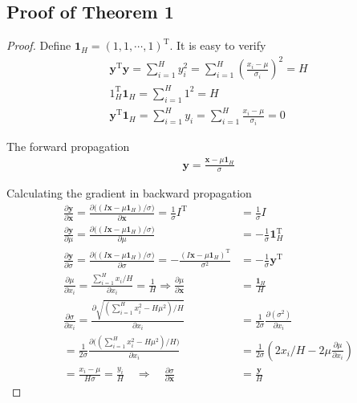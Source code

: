 \documentclass{article}
\newcommand*{\vect}[1]{\textbf{#1}}
\begin{document}
\subsection{Proof of Theorem 1}
\begin{proof}
Define $\vect{1}_H=(1, 1, \cdots, 1)^\text{T}$. It is easy to verify
\begin{equation}\begin{aligned}
\vect{y}^\text{T}\vect{y}=\sum\limits_{i=1}^Hy_i^2=\sum\limits_{i=1}^H(\frac{x_i-\mu}{\sigma_i})^2=H \\
\text{1}_H^\text{T}\vect{1}_H=\sum\limits_{i=1}^H1^2=H\\
\vect{y}^\text{T}\vect{1}_H=\sum\limits_{i=1}^Hy_i=\sum\limits_{i=1}^H\frac{x_i-\mu}{\sigma_i}=0
\end{aligned}\end{equation}

The forward propagation 
\begin{equation}\begin{aligned}
\vect{y}=\frac{\vect{x}-\mu\vect{1}_H}{\sigma}
\end{aligned}\end{equation}

Calculating the gradient in backward propagation
\begin{equation}\begin{aligned}
\frac{\partial\vect{y}}{\partial\vect{x}}=\frac{\partial\big((I\vect{x}-\mu\vect{1}_H)/\sigma\big)}{\partial \vect{x}}=\frac{1}{\sigma}I^\text{T}&=\frac{1}{\sigma}I \\
\frac{\partial\vect{y}}{\partial\mu} =\frac{\partial\big((I\vect{x}-\mu\vect{1}_H)/\sigma\big)}{\partial \mu}&=-\frac{1}{\sigma}\vect{1}_H^\text{T}\\
\frac{\partial\vect{y}}{\partial\sigma} =\frac{\partial\big((I\vect{x}-\mu\vect{1}_H)/\sigma\big)}{\partial \sigma}=-\frac{(I\vect{x}-\mu\vect{1}_H)^\text{T}}{\sigma^2}&=-\frac{1}{\sigma}\vect{y}^\text{T}\\
\frac{\partial\mu}{\partial{x}_i}=\frac{\sum\limits_{i=1}^H x_i/H}{\partial{x}_i}=\frac{1}{H}\Longrightarrow \frac{\partial\mu}{\partial\vect{x}}&=\frac{\vect{1}_H}{H}\\
\frac{\partial\sigma}{\partial{x}_i}=\frac{\partial\sqrt{(\sum\limits_{i=1}^Hx_i^2-H\mu^2)/H}}{\partial{x}_i}&=\frac{1}{2\sigma}\frac{\partial(\sigma^2)}{\partial{x}_i}\\
=\frac{1}{2\sigma}\frac{\partial\big((\sum\limits_{i=1}^Hx_i^2-H\mu^2)/H\big)}{\partial{x}_i}&=\frac{1}{2\sigma}({2x_i/H-2\mu\frac{\partial\mu}{\partial x_i}}) \\
=\frac{x_i-\mu}{H\sigma}=\frac{y_i}{H} \quad \Longrightarrow \quad \frac{\partial\sigma}{\partial\vect{x}}&=\frac{\vect{y}}{H}
\end{aligned}\end{equation}


\end{proof}
\end{document}
